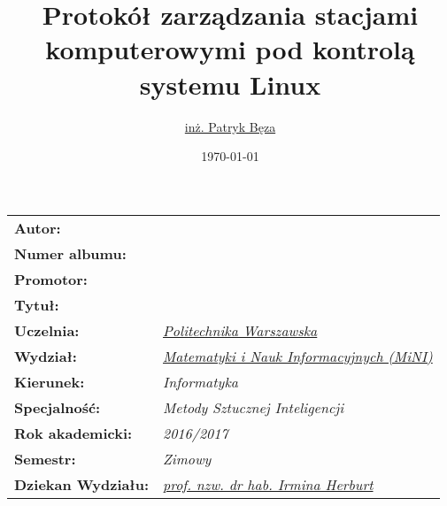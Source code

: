 \documentclass{mini}
\title{Protokół zarządzania stacjami komputerowymi pod kontrolą systemu Linux}
\author{\href{mailto:P.Beza@student.mini.pw.edu.pl}{inż. Patryk Bęza}}
\date{\today}
\begin{document}
\maketitle
\makeatletter
{
	\renewcommand{\arraystretch}{2.5}
	\vspace*{\fill}
	\begin{table}[h]
	\centering
	\begin{tabular}{>{\bfseries}l>{\itshape}l}
		Autor:            & \@author\\
		Numer albumu:     & \@album\\
		Promotor:         & \@supervisor\\
		Tytuł:            & \parbox{6.5cm}{\@title}\\
		Uczelnia:         & \href{https://www.pw.edu.pl/}{Politechnika Warszawska}\\
		Wydział:          & \href{http://www.mini.pw.edu.pl/}{Matematyki i Nauk Informacyjnych (MiNI)}\\
		Kierunek:         & Informatyka\\
		Specjalność:      & Metody Sztucznej Inteligencji\\
		Rok akademicki:   & 2016/2017\\
		Semestr:          & Zimowy\\
		Dziekan Wydziału: & \href{mailto:I.Herburt@mini.pw.edu.pl}{prof. nzw. dr hab. Irmina Herburt}\\
	\end{tabular}
	\end{table}
	\vspace*{\fill}
}
\makeatother
\tableofcontents

\printglossary[style=clong,title=Słownik pojęć]






%
%

%
%
\printbibliography
\end{document}
